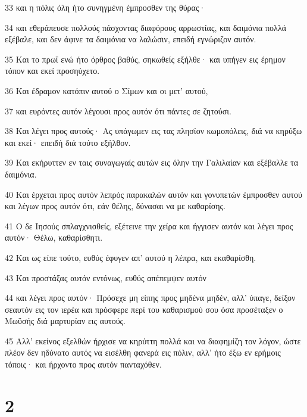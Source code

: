 \par 33 και η πόλις όλη ήτο συνηγμένη έμπροσθεν της θύρας·
\par 34 και εθεράπευσε πολλούς πάσχοντας διαφόρους αρρωστίας, και δαιμόνια πολλά εξέβαλε, και δεν άφινε τα δαιμόνια να λαλώσιν, επειδή εγνώριζον αυτόν.
\par 35 Και το πρωΐ ενώ ήτο όρθρος βαθύς, σηκωθείς εξήλθε· και υπήγεν εις έρημον τόπον και εκεί προσηύχετο.
\par 36 Και έδραμον κατόπιν αυτού ο Σίμων και οι μετ' αυτού,
\par 37 και ευρόντες αυτόν λέγουσι προς αυτόν ότι πάντες σε ζητούσι.
\par 38 Και λέγει προς αυτούς· Ας υπάγωμεν εις τας πλησίον κωμοπόλεις, διά να κηρύξω και εκεί· επειδή διά τούτο εξήλθον.
\par 39 Και εκήρυττεν εν ταις συναγωγαίς αυτών εις όλην την Γαλιλαίαν και εξέβαλλε τα δαιμόνια.
\par 40 Και έρχεται προς αυτόν λεπρός παρακαλών αυτόν και γονυπετών έμπροσθεν αυτού και λέγων προς αυτόν ότι, εάν θέλης, δύνασαι να με καθαρίσης.
\par 41 Ο δε Ιησούς σπλαγχνισθείς, εξέτεινε την χείρα και ήγγισεν αυτόν και λέγει προς αυτόν· Θέλω, καθαρίσθητι.
\par 42 Και ως είπε τούτο, ευθύς έφυγεν απ' αυτού η λέπρα, και εκαθαρίσθη.
\par 43 Και προστάξας αυτόν εντόνως, ευθύς απέπεμψεν αυτόν
\par 44 και λέγει προς αυτόν· Πρόσεχε μη είπης προς μηδένα μηδέν, αλλ' ύπαγε, δείξον σεαυτόν εις τον ιερέα και πρόσφερε περί του καθαρισμού σου όσα προσέταξεν ο Μωϋσής διά μαρτυρίαν εις αυτούς.
\par 45 Αλλ' εκείνος εξελθών ήρχισε να κηρύττη πολλά και να διαφημίζη τον λόγον, ώστε πλέον δεν ηδύνατο αυτός να εισέλθη φανερά εις πόλιν, αλλ' ήτο έξω εν ερήμοις τόποις· και ήρχοντο προς αυτόν πανταχόθεν.

\chapter{2}

